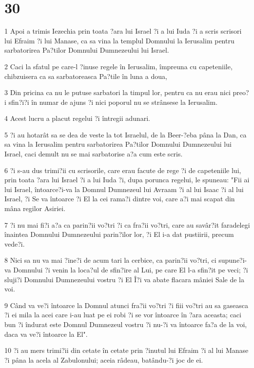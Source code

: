 \chapter{30}

\par 1 Apoi a trimis Iezechia prin toata ?ara lui Israel ?i a lui Iuda ?i a scris scrisori lui Efraim ?i lui Manase, ca sa vina la templul Domnului la Ierusalim pentru sarbatorirea Pa?tilor Domnului Dumnezeului lui Israel.
\par 2 Caci la sfatul pe care-l ?inuse regele în Ierusalim, împreuna cu capeteniile, chibzuisera ca sa sarbatoreasca Pa?tile în luna a doua,
\par 3 Din pricina ca nu le putuse sarbatori la timpul lor, pentru ca nu erau nici preo?i sfin?i?i în numar de ajuns ?i nici poporul nu se strânsese la Ierusalim.
\par 4 Acest lucru a placut regelui ?i întregii adunari.
\par 5 ?i au hotarât sa se dea de veste la tot Israelul, de la Beer-?eba pâna la Dan, ca sa vina la Ierusalim pentru sarbatorirea Pa?tilor Domnului Dumnezeului lui Israel, caci demult nu se mai sarbatorise a?a cum este scris.
\par 6 ?i s-au dus trimi?ii cu scrisorile, care erau facute de rege ?i de capeteniile lui, prin toata ?ara lui Israel ?i a lui Iuda ?i, dupa porunca regelui, le spuneau: "Fii ai lui Israel, întoarce?i-va la Domnul Dumnezeul lui Avraam ?i al lui Isaac ?i al lui Israel, ?i Se va întoarce ?i El la cei rama?i dintre voi, care a?i mai scapat din mâna regilor Asiriei.
\par 7 ?i nu mai fi?i a?a ca parin?ii vo?tri ?i ca fra?ii vo?tri, care au savâr?it faradelegi înaintea Domnului Dumnezeului parin?ilor lor, ?i El i-a dat pustiirii, precum vede?i.
\par 8 Nici sa nu va mai ?ine?i de acum tari la cerbice, ca parin?ii vo?tri, ci supune?i-va Domnului ?i venin la loca?ul de sfin?ire al Lui, pe care El l-a sfin?it pe veci; ?i sluji?i Domnului Dumnezeului vostru ?i El Î?i va abate flacara mâniei Sale de la voi.
\par 9 Când va ve?i întoarce la Domnul atunci fra?ii vo?tri ?i fiii vo?tri au sa gaseasca ?i ei mila la acei care i-au luat pe ei robi ?i se vor întoarce în ?ara aceasta; caci bun ?i îndurat este Domnul Dumnezeul vostru ?i nu-?i va întoarce fa?a de la voi, daca va ve?i întoarce la El".
\par 10 ?i au mers trimi?ii din cetate în cetate prin ?inutul lui Efraim ?i al lui Manase ?i pâna la acela al Zabulonului; aceia râdeau, batându-?i joc de ei.
